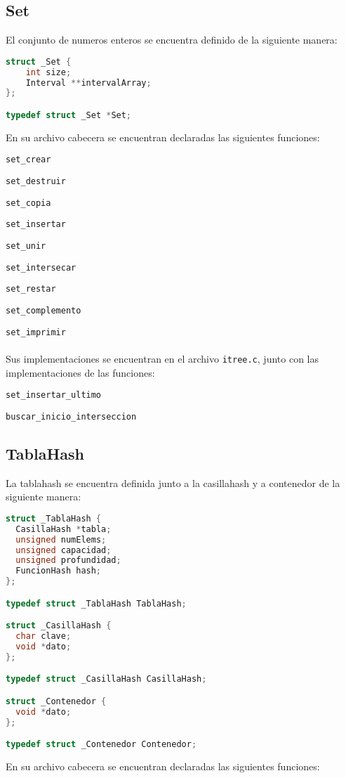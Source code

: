 \documentclass[]{article}
\begin{document}
\subsection{Set}
El conjunto de numeros enteros se encuentra definido de la siguiente manera:

\begin{lstlisting}[language=C]
struct _Set {
    int size;
    Interval **intervalArray;
};

typedef struct _Set *Set;

\end{lstlisting}
En su archivo cabecera se encuentran declaradas las siguientes funciones:

\verb|set_crear|

\verb|set_destruir|

\verb|set_copia|

\verb|set_insertar|

\verb|set_unir|

\verb|set_intersecar|

\verb|set_restar|

\verb|set_complemento|

\verb|set_imprimir|\\\\
Sus implementaciones se encuentran en el archivo \verb|itree.c|, junto con las implementaciones de las funciones:

\verb|set_insertar_ultimo|

\verb|buscar_inicio_interseccion|
\subsection{TablaHash}
La tablahash se encuentra definida junto a la casillahash y a contenedor de la siguiente manera:

\begin{lstlisting}[language=C]
struct _TablaHash {
  CasillaHash *tabla;
  unsigned numElems;
  unsigned capacidad;
  unsigned profundidad;
  FuncionHash hash;
};

typedef struct _TablaHash TablaHash;

struct _CasillaHash {
  char clave;
  void *dato;
};

typedef struct _CasillaHash CasillaHash;

struct _Contenedor {
  void *dato;
};

typedef struct _Contenedor Contenedor;

\end{lstlisting}
En su archivo cabecera se encuentran declaradas las siguientes funciones:
\end{document}
